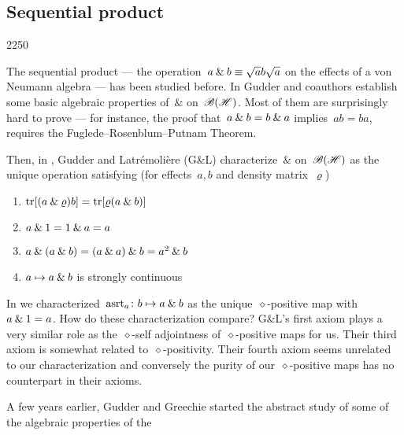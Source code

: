 \subsection{Sequential product}
\begin{parsec}{2250}%
\begin{point}{10}%
The sequential product --- the
    operation~$a \mathbin{\&} b \equiv \sqrt{a}b\sqrt{a}$
    on the effects of a von Neumann algebra
    --- has been studied before.
In \cite{gudder2001sequential,gheondea2004sequential}
    Gudder and coauthors establish some basic algebraic properties of~$\&$
    on~$\mathscr{B}(\mathscr{H})$.
Most of them are surprisingly hard to prove ---
    for instance, the proof that~$a \mathbin{\&} b=b \mathbin{\&} a$
    implies~$ab = ba$, requires
    the Fuglede--Rosenblum--Putnam Theorem.
\begin{point}{20}%
Then, in \cite{gudder2008characterization},
    Gudder and Latr\'emoli\`ere (G\&L)
    characterize~$\&$ on~$\mathscr{B}(\mathscr{H})$ as the unique operation satisfying
    (for effects~$a,b$ and density matrix~$\varrho$)
\begin{multicols}{2}
\begin{enumerate}
    \item $\mathop{\mathrm{tr}} [ (a \mathbin{\&} \varrho) b] = \mathop{\mathrm{tr}} [\varrho
                    (a \mathbin{\&} b)]$
    \item $a \mathbin{\&} 1 = 1 \mathbin{\&} a = a$
    \item $ a \mathbin{\&} (a \mathbin{\&} b) =
            (a \mathbin{\&} a) \mathbin{\&} b =
            a^2 \mathbin{\&} b$
        \item $a \mapsto a \mathbin{\&} b$ is strongly continuous
\end{enumerate}    
\end{multicols}
\noindent
In  we characterized~$\mathrm{asrt}_a \colon b \mapsto a \mathbin{\&} b$
    as the unique~$\diamond$-positive map with~$a \mathbin{\&} 1 = a$.
How do these characterization compare?
G\&L's first axiom plays a very similar role
        as the~$\diamond$-self adjointness of~$\diamond$-positive maps for us.
Their third axiom is somewhat related to~$\diamond$-positivity.
Their fourth axiom seems unrelated to our characterization
    and conversely the purity of our~$\diamond$-positive maps
    has no counterpart in their axioms.
\end{point}
\begin{point}{30}%
A few years earlier, Gudder and Greechie started
    \cite{gudder2001sequential}
    the abstract study of some of the algebraic properties of the

\end{point}
\end{point}
\end{parsec}
